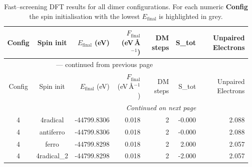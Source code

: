 
\begin{longtable}{@{}ccrrrrr@{}}
\caption{Fast–screening DFT results for all dimer configurations.
         For each numeric \textbf{Config} the spin initialisation with the
         lowest $E_{\mathrm{final}}$ is highlighted in grey.}\label{tab:dimer_full}\\
\toprule
Config & Spin init & $E_{\mathrm{final}}$ (eV) &
$F_{\mathrm{final}}$ (eV\,\AA$^{-1}$) & DM steps & S_{tot} & Unpaired Electrons\\
\midrule
\endfirsthead
\multicolumn{6}{c}{{\tablename}~\thetable{} — continued from previous page}\\
\toprule
Config & Spin init & $E_{\mathrm{final}}$ (eV) &
$F_{\mathrm{final}}$ (eV\,\AA$^{-1}$) & DM steps & S_{tot} & Unpaired Electrons\\
\midrule
\endhead
\midrule
\multicolumn{6}{r}{\emph{Continued on next page}}\\
\endfoot
\bottomrule
\endlastfoot
\rowcolor{gray!20} 4 & 4radical & -44799.8306 & 0.018 & 2 & -0.000 & 2.088 \\
4 & antiferro & -44799.8306 & 0.018 & 2 & -0.000 & 2.088 \\
4 & ferro & -44799.8298 & 0.018 & 2 & 2.000 & 2.057 \\
4 & 4radical\_2 & -44799.8298 & 0.018 & 2 & -2.000 & 2.057 \\
\end{longtable}